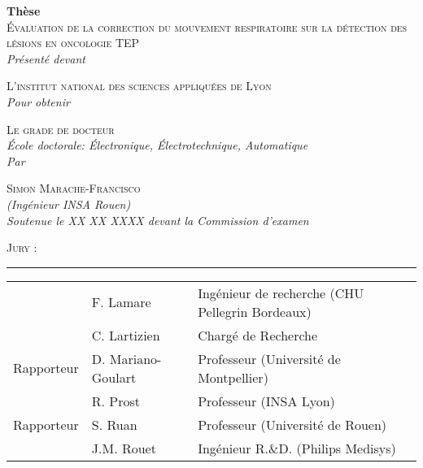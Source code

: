 \begin{titlepage}

\begin{center}



\textbf{\large Thèse}\\[0.5cm]

\textsc{\LARGE \'Evaluation de la correction du mouvement respiratoire sur la détection des lésions en oncologie TEP}\\[1.5cm]

\textsl{\large Présenté devant}

\textsc{\large L’institut national des sciences appliquées de Lyon}\\[1.5cm]

\textsl{\large Pour obtenir}

\textsc{\large Le grade de docteur}\\[1.5cm]

\textsl{\large École doctorale: \'Electronique, \'Electrotechnique, Automatique}\\[1.5cm]

\textsl{\large Par}

\textsc{\large Simon Marache-Francisco}\\\textsl{(Ingénieur INSA Rouen)}\\[0.5cm]

\textsl{\large Soutenue le XX XX XXXX devant la Commission d’examen}\\[1cm]

\vfill 

\textsc{\Large Jury :}

\rule{\linewidth}{0.2 em}

\begin{tabular}{l l l}
	& F. Lamare	& Ingénieur de recherche (CHU Pellegrin Bordeaux) \\
	& C. Lartizien	& Chargé de Recherche\\
Rapporteur	& D. Mariano-Goulart & Professeur (Université de Montpellier)\\
	& R. Prost	& Professeur (INSA Lyon)\\
Rapporteur	& S. Ruan	& Professeur (Université de Rouen)\\
	& J.M. Rouet	& Ingénieur R.\&D. (Philips Medisys)\\
\end{tabular}



\end{center}

\end{titlepage}